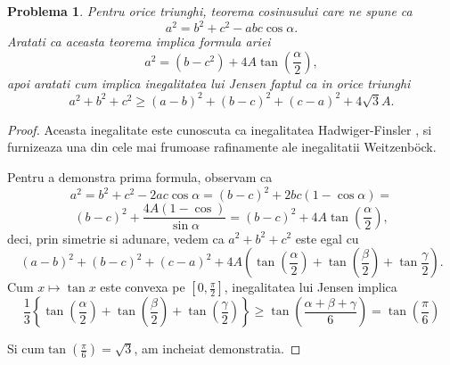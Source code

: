 \documentclass[a4paper,12pt,oneside]{report}
\newtheorem{problem}{Problema}
\begin{document}
\begin{problem}
Pentru orice triunghi, teorema cosinusului care ne spune ca
\begin{displaymath}
  a^{2} = b^{2}+ c^{2} - abc\cos\alpha.
\end{displaymath}
Aratati ca aceasta teorema implica formula ariei
\begin{displaymath}
  a^{2} = \left ( b - c^{2} \right ) + 4 A\tan \left ( \frac{\alpha }{2} \right ),
\end{displaymath}
apoi aratati cum implica inegalitatea lui Jensen faptul ca in orice triunghi
\begin{displaymath}
  a^{2} + b^{2} + c^{2} \geq  \left ( a - b  \right )^{2} + \left ( b- c  \right )^{2} + \left ( c - a \right )^{2} + 4\sqrt{3}A.
\end{displaymath}
\end{problem}
\begin{proof}
Aceasta inegalitate este cunoscuta ca inegalitatea Hadwiger-Finsler , si furnizeaza una din cele mai frumoase rafinamente ale inegalitatii Weitzenböck.

Pentru a demonstra prima formula, observam ca
\begin{displaymath}
  a^{2} = b^{2} + c^{2} - 2ac\cos\alpha  = \left (  b - c \right )^{2} + 2bc\left ( 1 - \cos\alpha  \right )=
\end{displaymath}
\begin{displaymath}
 \left ( b - c \right )^{2} + \frac{4A\left ( 1 - \cos  \right )}{\sin \alpha } = \left ( b - c \right )^{2} + 4A\tan\left ( \frac{\alpha }{2} \right ),
\end{displaymath}
deci, prin simetrie si adunare, vedem ca
\(a^{2} + b^{2} + c^{2}\) este egal cu
\begin{displaymath}
  \left ( a - b  \right )^{2} + \left ( b - c \right )^{2} + \left ( c - a  \right )^{2} + 4A\left ( \tan\left ( \frac{\alpha }{2} \right ) + \tan\left ( \frac{\beta }{2} \right ) + \tan \frac{\gamma }{2} \right ).
\end{displaymath}
	Cum \(x \mapsto \tan x\) este convexa pe \(\left [ 0 , \frac{\pi }{2} \right ]\), inegalitatea lui Jensen implica
\begin{displaymath}
  \frac{1}{3}\left \{ \tan \left ( \frac{\alpha }{2} \right ) + \tan \left ( \frac{\beta }{2} \right )  + \tan \left ( \frac{\gamma }{2} \right )\right \} \geq  \tan\left ( \frac{\alpha  + \beta  + \gamma }{6} \right ) = \tan \left ( \frac{\pi }{6} \right)
\end{displaymath}

Si cum\(\tan \left ( \frac{\pi }{6} \right ) = \sqrt{3}\),  am incheiat demonstratia.
\end{proof}
\end{document}
